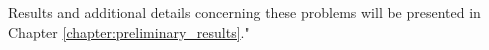 Results and additional details concerning these problems will be presented in Chapter \ref{chapter:preliminary_results}."
